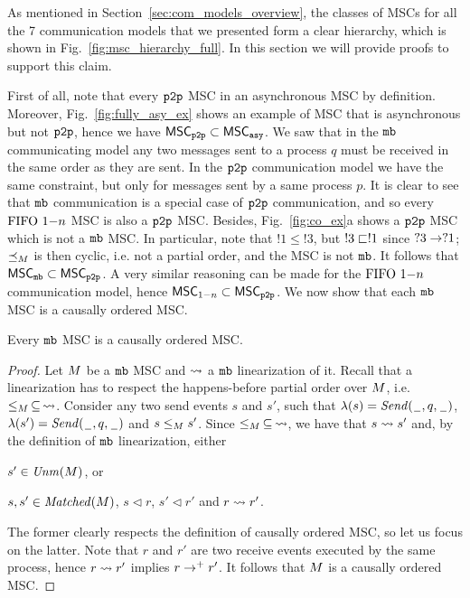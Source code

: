
As mentioned in Section~\ref{sec:com_models_overview}, the classes of MSCs for all the 7 communication models that we presented form a clear hierarchy, which is shown in Fig.~\ref{fig:msc_hierarchy_full}. In this section we will provide proofs to support this claim. 

\medskip

First of all, note that every $\mathtt{p2p}$ MSC in an asynchronous MSC by definition. Moreover, Fig.~\ref{fig:fully_asy_ex} shows an example of MSC that is asynchronous but not $\mathtt{p2p}$, hence we have $\mathsf{MSC}_{\mathtt{p2p}} \subset \mathsf{MSC}_{\mathtt{asy}}$. We saw that in the $\mathtt{mb}$ communicating model any two messages sent to a process $q$ must be received in the same order as they are sent. In the $\mathtt{p2p}$ communication model we have the same constraint, but only for messages sent by a same process $p$. It is clear to see that $\mathtt{mb}$ communication is a special case of $\mathtt{p2p}$ communication, and so every $\text{FIFO } 1\mathsf{-}n$ MSC is also a $\mathtt{p2p}$ MSC. Besides, Fig.~\ref{fig:co_ex}a shows a $\mathtt{p2p}$ MSC which is not a $\mathtt{mb}$ MSC. In particular, note that $!1 \le !3$, but $!3 \sqsubset !1$ since $?3 \to ?1$; $\preceq_M$ is then cyclic, i.e. not a partial order, and the MSC is not $\mathtt{mb}$. It follows that $\mathsf{MSC}_{\mathtt{mb}} \subset \mathsf{MSC}_{\mathtt{p2p}}$. A very similar reasoning can be made for the $\text{FIFO } 1\mathsf{-}n$ communication model, hence $\mathsf{MSC}_{1\mathsf{-}n} \subset \mathsf{MSC}_{\mathtt{p2p}}$. We now show that each $\mathtt{mb}$ MSC is a causally ordered MSC.

\begin{proposition} \label{prop:mb_is_co}
	Every $\mathtt{mb}$ MSC is a causally ordered MSC.
\end{proposition}
\begin{proof}
Let $M$ be a $\mathtt{mb}$ MSC and $\rightsquigarrow$ a $\mathtt{mb}$ linearization of it. Recall that a linearization has to respect the happens-before partial order over $M$, i.e. $\le_M \,\subseteq\, \rightsquigarrow$. Consider any two send events $s$ and $s'$, such that $\lambda(s)={\mathit{Send}(\hspace{0.1em}\underline{\hspace{0.5em}}\hspace{0.1em},q,\hspace{0.1em}\underline{\hspace{0.5em}}\hspace{0.1em})}$, $\lambda(s')={\mathit{Send}(\hspace{0.1em}\underline{\hspace{0.5em}}\hspace{0.1em},q,\hspace{0.1em}\underline{\hspace{0.5em}}\hspace{0.1em})}$ and $s \le_M s'$. Since $\le_M \,\subseteq\, \rightsquigarrow$, we have that $s \rightsquigarrow s'$ and, by the definition of $\mathtt{mb}$ linearization, either
\begin{enumerate*}[label={(\roman*)}]
	\item $s' \in \mathit{Unm}(M)$, or 
	\item $s,s' \in \mathit{Matched}(M)$, $s \lhd r$, $s' \lhd r'$ and $r \rightsquigarrow r'$. 
\end{enumerate*}
The former clearly respects the definition of causally ordered MSC, so let us focus on the latter. Note that $r$ and $r'$ are two receive events executed by the same process, hence $r \rightsquigarrow r'$ implies $r \to^+ r'$. It follows that $M$ is a causally ordered MSC.
\end{proof}

